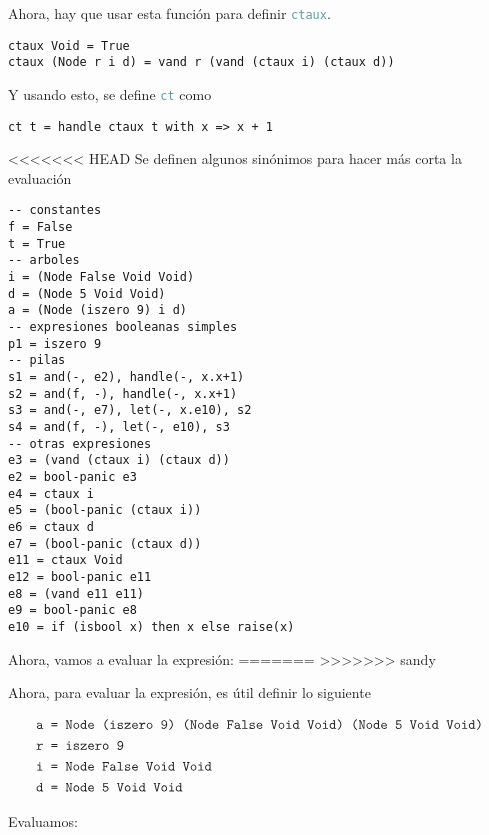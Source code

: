 \documentclass{article}
\newcommand{\tx}[1]{\textcolor{Black} {\texttt{#1}}}
\newcommand{\tp}[1]{\textcolor{CadetBlue} {\texttt{#1}}}
\begin{document}
\begin{enumerate}
        Ahora, hay que usar esta función para definir \tp{ctaux}.

        \begin{verbatim}
ctaux Void = True
ctaux (Node r i d) = vand r (vand (ctaux i) (ctaux d))
        \end{verbatim}

        Y usando esto, se define \tp{ct} como

        \begin{verbatim}
ct t = handle ctaux t with x => x + 1
        \end{verbatim}

<<<<<<< HEAD
        Se definen algunos sinónimos para hacer más corta la evaluación

        \begin{verbatim}
-- constantes
f = False
t = True
-- arboles
i = (Node False Void Void)
d = (Node 5 Void Void)
a = (Node (iszero 9) i d)
-- expresiones booleanas simples
p1 = iszero 9
-- pilas
s1 = and(-, e2), handle(-, x.x+1)
s2 = and(f, -), handle(-, x.x+1)
s3 = and(-, e7), let(-, x.e10), s2
s4 = and(f, -), let(-, e10), s3
-- otras expresiones
e3 = (vand (ctaux i) (ctaux d))
e2 = bool-panic e3
e4 = ctaux i
e5 = (bool-panic (ctaux i))
e6 = ctaux d
e7 = (bool-panic (ctaux d))
e11 = ctaux Void
e12 = bool-panic e11
e8 = (vand e11 e11)
e9 = bool-panic e8
e10 = if (isbool x) then x else raise(x)
        \end{verbatim}

        Ahora, vamos a evaluar la expresión:
=======
>>>>>>> sandy

		Ahora, para evaluar la expresión, es útil definir lo siguiente
		
		
		\begin{align*}
		&\tx{a = Node (iszero 9) (Node False Void Void) (Node 5 Void Void)} \\
		&\tx{r = iszero 9}\\
		&\tx{i = Node False Void Void}\\
		&\tx{d = Node 5 Void Void}
		\end{align*}

        Evaluamos:
        

\end{enumerate}
\end{document}
